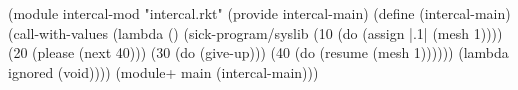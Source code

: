 \begin{CodeBlock}
(module intercal-mod "intercal.rkt"
  (provide intercal-main)
  (define (intercal-main)
    (call-with-values
     (lambda ()
       (sick-program/syslib
        (10 (do (assign |.1| (mesh 1))))
        (20 (please (next 40)))
        (30 (do (give-up)))
        (40 (do (resume (mesh 1))))))
     (lambda ignored (void))))
  (module+ main (intercal-main)))

\end{CodeBlock}
